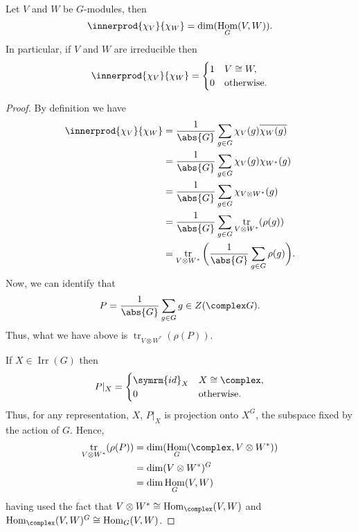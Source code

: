 \documentclass[fleqn]{NotesClass}
\newcommand{\id}{\symrm{id}}
\DeclareMathOperator{\Hom}{Hom}
\newcommand{\isomorphic}{\cong}
\DeclareMathOperator{\Irr}{Irr}
\DeclareMathOperator{\tr}{tr}
\begin{document}
    \begin{thm}{}{}
        Let \(V\) and \(W\) be \(G\)-modules, then
        \begin{equation}
            \innerprod{\chi_V}{\chi_W} = \dim(\Hom_G(V, W)).
        \end{equation}
        In particular, if \(V\) and \(W\) are irreducible then
        \begin{equation}
            \innerprod{\chi_V}{\chi_W} =
            \begin{cases}
                1 & V \isomorphic W,\\
                0 & \text{otherwise}.
            \end{cases}
        \end{equation}
        \begin{proof}
            By definition we have
            \begin{align}
                \innerprod{\chi_V}{\chi_W} &= \frac{1}{\abs{G}} \sum_{g \in G} \chi_V(g) \overline{\chi_W(g)}\\
                &= \frac{1}{\abs{G}} \sum_{g \in G} \chi_V(g) \chi_{W^*}(g)\\
                &= \frac{1}{\abs{G}} \sum_{g \in G} \chi_{V \otimes W^*}(g)\\
                &= \frac{1}{\abs{G}} \sum_{g \in G} \tr_{V \otimes W^*}(\rho(g))\\
                &= \tr_{V \otimes W^*}\bigg( \frac{1}{\abs{G}} \sum_{g \in G} \rho(g) \bigg).
            \end{align}
            Now, we can identify that
            \begin{equation}
                P = \frac{1}{\abs{G}} \sum_{g \in G} g \in Z(\complex G).
            \end{equation}
            Thus, what we have above is \(\tr_{V \otimes W^*}(\rho(P))\).
            
            If \(X \in \Irr(G)\) then
            \begin{equation}
                P|_X =
                \begin{cases}
                    \id_X & X \isomorphic \complex,\\
                    0 & \text{otherwise}.
                \end{cases}
            \end{equation}
            Thus, for any representation, \(X\), \(P|_X\) is projection onto \(X^G\), the subspace fixed by the action of \(G\).
            Hence,
            \begin{align}
                \tr_{V \otimes W^*}(\rho(P)) &= \dim(\Hom_G(\complex, V \otimes W^*))\\
                &= \dim(V \otimes W^*)^G\\
                &= \dim \Hom_G(V, W)
            \end{align}
            having used the fact that \(V \otimes W^* \isomorphic \Hom_{\complex}(V, W)\) and \(\Hom_{\complex}(V, W)^G \isomorphic \Hom_G(V, W)\).
        \end{proof}
    \end{thm}
    
\end{document}
